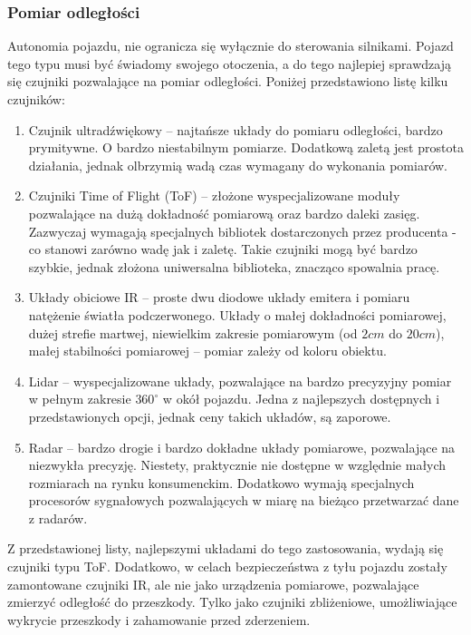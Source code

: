         \subsubsection{Pomiar odległości}
            Autonomia pojazdu, nie ogranicza się wyłącznie do sterowania silnikami.
            Pojazd tego typu musi być świadomy swojego otoczenia, a do tego najlepiej sprawdzają się czujniki pozwalające na pomiar odległości.
            Poniżej przedstawiono listę kilku czujników:
            \begin{enumerate}
                \item Czujnik ultradźwiękowy -- najtańsze układy do pomiaru odległości, bardzo prymitywne.
                O bardzo niestabilnym pomiarze. Dodatkową zaletą jest prostota działania, jednak olbrzymią wadą czas wymagany do wykonania pomiarów.
                \item Czujniki Time of Flight (ToF) -- złożone wyspecjalizowane moduły pozwalające na dużą dokładność pomiarową oraz bardzo daleki zasięg.
                Zazwyczaj wymagają specjalnych bibliotek dostarczonych przez producenta - co stanowi zarówno wadę jak i zaletę. Takie czujniki mogą być bardzo szybkie, jednak złożona uniwersalna biblioteka, znacząco spowalnia pracę.
                \item Układy obiciowe IR -- proste dwu diodowe układy emitera i pomiaru natężenie światła podczerwonego. Układy o małej dokładności pomiarowej, dużej strefie martwej, niewielkim zakresie pomiarowym (od $2cm$ do $20cm$), małej stabilności pomiarowej -- pomiar zależy od koloru obiektu.
                \item Lidar -- wyspecjalizowane układy, pozwalające na bardzo precyzyjny pomiar w pełnym zakresie $360^\circ$ w okół pojazdu.
                Jedna z najlepszych dostępnych i przedstawionych opcji, jednak ceny takich układów, są zaporowe.
                \item Radar -- bardzo drogie i bardzo dokładne układy pomiarowe, pozwalające na niezwykła precyzję. Niestety, praktycznie nie dostępne w względnie małych rozmiarach na rynku konsumenckim. Dodatkowo wymają specjalnych procesorów sygnałowych pozwalających w miarę na bieżąco przetwarzać dane z radarów.
            \end{enumerate}
            Z przedstawionej listy, najlepszymi układami do tego zastosowania, wydają się czujniki typu ToF.
            Dodatkowo, w celach bezpieczeństwa z tyłu pojazdu zostały zamontowane czujniki IR, ale nie jako urządzenia pomiarowe, pozwalające zmierzyć odległość do przeszkody.
            Tylko jako czujniki zbliżeniowe, umożliwiające wykrycie przeszkody i zahamowanie przed zderzeniem.

